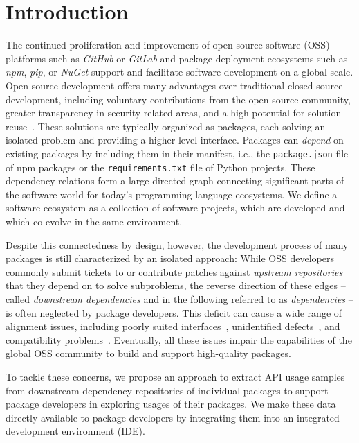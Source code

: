 \documentclass[a4paper,twoside]{article}
\begin{document}
\onecolumn \maketitle \normalsize \setcounter{footnote}{0} \vfill


\section{Introduction}
\label{sec:introduction}

The continued proliferation and improvement of open-source software (OSS) platforms such as \emph{GitHub} or \emph{GitLab} and package deployment ecosystems such as \emph{npm}, \emph{pip}, or \emph{NuGet} support and facilitate software development on a global scale.
Open-source development offers many advantages over traditional closed-source development, including voluntary contributions from the open-source community, greater transparency in security-related areas, and a high potential for solution reuse~\cite{saied2018-reusability}.
These solutions are typically organized as packages, each solving an isolated problem and providing a higher-level interface.
Packages can \emph{depend} on existing packages by including them in their manifest, i.e., the \texttt{package.json} file of npm packages or the \texttt{requirements.txt} file of Python projects.
These dependency relations form a large directed graph connecting significant parts of the software world for today's programming language ecosystems.
We define a software ecosystem as a collection of software projects, which are developed and which co-evolve in the same environment.

Despite this connectedness by design, however, the development process of many packages is still characterized by an isolated approach:
While OSS developers commonly submit tickets to or contribute patches against \emph{upstream repositories} that they depend on to solve subproblems, the reverse direction of these edges -- called \emph{downstream dependencies} and in the following referred to as \emph{dependencies} -- is often neglected by package developers.
This deficit can cause a wide range of alignment issues, including poorly suited interfaces~\cite{piccioni2013empirical}, unidentified defects~\cite{wong2017more}, and compatibility problems~\cite{bogart2015breaks}.
Eventually, all these issues impair the capabilities of the global OSS community to build and support high-quality packages.

To tackle these concerns, we propose an approach to extract API usage samples from downstream-dependency repositories of individual packages to support package developers in exploring usages of their packages.
We make these data directly available to package developers by integrating them into an integrated development environment (IDE).
\end{document}
